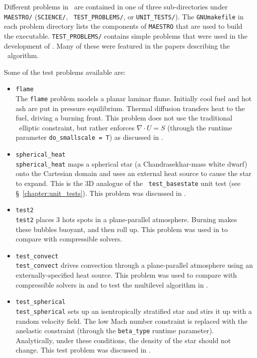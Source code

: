 Different problems in \maestro\ are contained in one of three
sub-directories under {\tt MAESTRO/} ({\tt SCIENCE/}, {\tt
TEST\_PROBLEMS/}, or {\tt UNIT\_TESTS/}).  The {\tt GNUmakefile} in each
problem directory lists the components of {\tt MAESTRO} that are used
to build the executable.  {\tt TEST\_PROBLEMS/} contains simple
problems that were used in the development of \maestro.  Many
of these were featured in the papers describing the \maestro\ algorithm.

Some of the test problems available are:
\begin{itemize}
\item {\tt flame} \\[-3mm]

The {\tt flame} problem models a planar laminar flame.  Initially cool
fuel and hot ash are put in pressure equilibrium.  Thermal diffusion
transfers heat to the fuel, driving a burning front.  This problem
does not use the traditional \maestro\ elliptic constraint, but
rather enforces $\nabla \cdot U = S$ (through the runtime parameter
{\tt do\_smallscale = T}) as discussed in \cite{SNe}.

\item {\tt spherical\_heat} \\[-3mm]

{\tt spherical\_heat} maps a spherical star (a Chandrasekhar-mass white
dwarf) onto the Cartesian domain and uses an external heat source to
cause the star to expand.  This is the 3D analogue of the {\tt
  test\_basestate} unit test (see \S~\ref{chapter:unit_tests}).  This
problem was discussed in \cite{multilevel}.

\item {\tt test2} \\[-3mm]

{\tt test2} places 3 hots spots in a plane-parallel atmosphere.
Burning makes these bubbles buoyant, and then roll up.  This problem was
used in \cite{lowMach3} to compare with compressible solvers.

\item {\tt test\_convect} \\[-3mm]

{\tt test\_convect} drives convection through a plane-parallel
atmosphere using an externally-specified heat source.  This problem
was used to compare with compressible solvers in \cite{lowMach3}
and to test the multilevel algorithm in \cite{multilevel}.

\item {\tt test\_spherical} \\[-3mm]

{\tt test\_spherical} sets up an isentropically stratified star
and stirs it up with a random velocity field.  The low Mach number
constraint is replaced with the anelastic constraint (through
the {\tt beta\_type} runtime parameter).  Analytically, under
these conditions, the density of the star should not change.
This test problem was discussed in \cite{lowMach4}.

\end{itemize}




